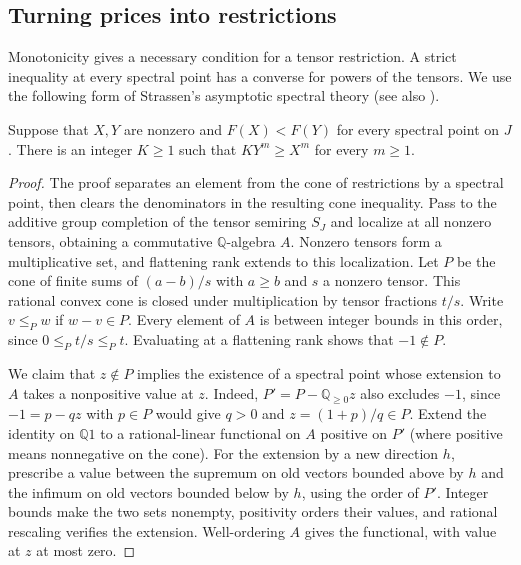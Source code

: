 \subsection{Turning prices into restrictions}
Monotonicity gives a necessary condition for a tensor restriction.
A strict inequality at every spectral point has a converse for powers
of the tensors. We use the following form of Strassen's asymptotic
spectral theory \cite{Strassen1988} (see also \cite{Fritz,WZ}).
\begin{lemma}\label{lem:spectral-comparison}
Suppose that $X,Y$ are nonzero and $F(X)<F(Y)$ for every spectral
point on $J$. There is an integer $K\ge 1$ such that
$K Y^m\ge X^m$ for every $m\ge 1$.
\end{lemma}
\begin{proof}
The proof separates an element from the cone of restrictions by a
spectral point, then clears the denominators in the resulting cone
inequality. Pass to the additive group completion of the tensor semiring
$S_J$ and localize at all
nonzero tensors, obtaining a commutative $\mathbb Q$-algebra
$A$. Nonzero tensors form a multiplicative set, and flattening rank
extends to this localization. Let $P$ be the cone of finite sums of
$(a-b)/s$ with $a\ge b$ and $s$ a nonzero tensor. This rational
convex cone is closed under multiplication by tensor fractions $t/s$.
Write $v\le_P w$ if $w-v\in P$. Every element of $A$ is between
integer bounds in this order, since $0\le_P t/s\le_P t$.
Evaluating at a flattening rank shows that $-1\notin P$.

We claim that $z\notin P$ implies the existence of a spectral point
whose extension to $A$ takes a nonpositive value at $z$. Indeed,
$P'=P-\mathbb Q_{\ge0}z$ also excludes $-1$, since $-1=p-qz$
with $p\in P$ would give $q>0$ and $z=(1+p)/q\in P$.
Extend the identity on $\mathbb Q1$ to a rational-linear functional
on $A$ positive on $P'$ (where positive means nonnegative on the
cone). For the extension by a new direction $h$, prescribe a value
between the supremum on old vectors bounded above by $h$ and the
infimum on old vectors bounded below by $h$, using the order of $P'$.
Integer bounds make the two sets nonempty, positivity orders their
values, and rational rescaling verifies the extension. Well-ordering $A$
gives the functional, with value at $z$ at most zero.


\end{proof}
